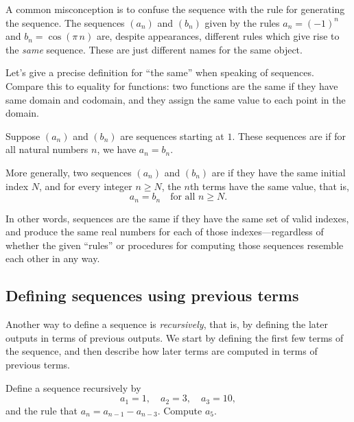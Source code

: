 \documentclass{ximera}
\begin{document}
\begin{warning}
  A common misconception is to confuse the sequence with the rule for
  generating the sequence.  The sequences $(a_n)$ and $(b_n)$ given by
  the rules $a_n = (-1)^n$ and $b_n = \cos (\pi \, n)$ are, despite
  appearances, different rules which give rise to the \textit{same}
  sequence.  These are just different names for the same object.
\end{warning}

Let's give a precise definition for ``the same'' when speaking of
sequences.  Compare this to equality for functions: two functions are
the same if they have same domain and codomain, and they assign the
same value to each point in the domain.


\begin{definition}
  Suppose $(a_n)$ and $(b_n)$ are sequences starting at $1$.  These
  sequences are  if for all
  natural numbers $n$, we have $a_n = b_n$.

  More generally, two sequences $(a_n)$ and $(b_n)$ are
   if they have the same initial index $N$, and for
  every integer $n \geq N$, the $n$th terms have the same value, that is,
  \[
  a_n = b_n \quad \mbox{for all $n \geq N$.}
  \]
\end{definition}
In other words, sequences are the same if they have the same set of
valid indexes, and produce the same real numbers for each of those
indexes---regardless of whether the given ``rules'' or procedures for
computing those sequences resemble each other in any way.

\subsection{Defining sequences using previous terms}
\label{subsection:recursive-definition}

Another way to define a sequence is \textit{recursively}, that is, by
defining the later outputs in terms of previous outputs.  We start by
defining the first few terms of the sequence, and then describe how
later terms are computed in terms of previous terms.

\begin{example}
Define a sequence recursively by
$$
a_1 = 1, \quad a_2 = 3, \quad a_3 = 10,
$$
and the rule that $a_n = a_{n-1} - a_{n-3}$.  Compute $a_5$.
\end{example}
\end{document}
